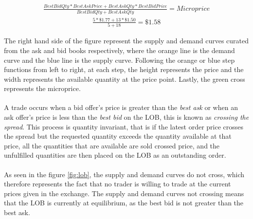 \documentclass[ %
                    author={Ashwinder Khurana},
                supervisor={Prof Dave Cliff},
                    degree={MEng},
                     title={The Deeply Reinforced Trader},
                  subtitle={},
                      type={enterprise},
                      year={2020} ]{dissertation}
\begin{document}
\begin{equation}
\label{microprice}
\begin{split}
\frac{BestBidQty * BestAskPrice + BestAskQty*BestBidPrice}{ BestBidQty + BestAskQty}  = Microprice 
\end{split}
\end{equation}
\begin{equation}
\begin{split}
\frac{5*\$1.77 + 13*\$1.50}{5 + 18} = \$1.58
\end{split}
\end{equation}

\noindent
The right hand side of the figure represent the supply and demand curves curated from the ask and bid books respectively, where the orange line is the demand curve and the blue line is the supply curve.  Following the orange or blue step functions from left to right, at each step, the height represents the price and the width represents the available quantity at the price point. Lastly, the green cross represents the microprice.
\\
\\
A trade occurs when a bid offer's price is greater than the \textit{best ask} or when an ask offer's price is less than the \textit{best bid} on the LOB, this is known as \textit{crossing the spread}. This process is quantity invariant, that is if the latest order price crosses the spread but the requested quantity exceeds the quantity available at that price, all the quantities that are available are sold crossed price, and the unfulfilled quantities are then placed on the LOB as an outstanding order.
\\
\\
\noindent
As seen in the figure \ref{fig:lob}, the supply and demand curves do not cross, which therefore represents the fact that no trader is willing to trade at the current prices given in the exchange. The supply and demand curves not crossing means that the LOB is currently at equilibrium, as the best bid is not greater than the best ask.
\end{document}
